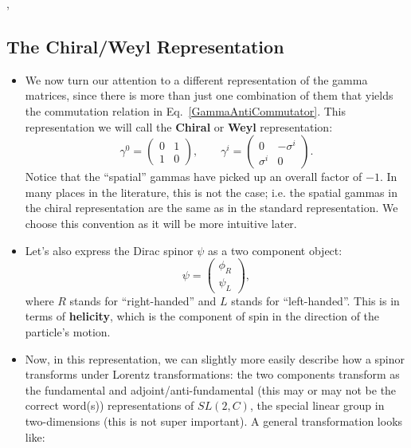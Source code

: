 \sep


\subsection{The Chiral/Weyl Representation}


\begin{itemize}
    \item We now turn our attention to a different representation of the gamma matrices, since there is more than just one combination of them that yields the commutation relation in Eq.~\eqref{GammaAntiCommutator}. This representation we will call the \textbf{Chiral} or \textbf{Weyl} representation:
        \begin{equation}
            \gamma^0 = \begin{pmatrix}0 & 1 \\ 1 & 0\end{pmatrix},\qquad \gamma^i = \begin{pmatrix}0 & -\sigma^i \\ \sigma^i & 0 \end{pmatrix}.\label{ChiralGammas}
        \end{equation}
        Notice that the ``spatial'' gammas have picked up an overall factor of $-1$. In many places in the literature, this is not the case; i.e. the spatial gammas in the chiral representation are the same as in the standard representation. We choose this convention as it will be more intuitive later.
    \item Let's also express the Dirac spinor $\psi$ as a two component object:
        \begin{equation}
            \psi = \begin{pmatrix}\phi_R \\ \psi_L\end{pmatrix},\label{ChiralSpinor}
        \end{equation}
        where $R$ stands for ``right-handed'' and $L$ stands for ``left-handed''. This is in terms of \textbf{helicity}, which is the component of spin in the direction of the particle's motion.
    \item Now, in this representation, we can slightly more easily describe how a spinor transforms under Lorentz transformations: the two components transform as the fundamental and adjoint/anti-fundamental (this may or may not be the correct word(s)) representations of $SL(2,C)$, the special linear group in two-dimensions (this is not super important). A general transformation looks like:

\end{itemize}
